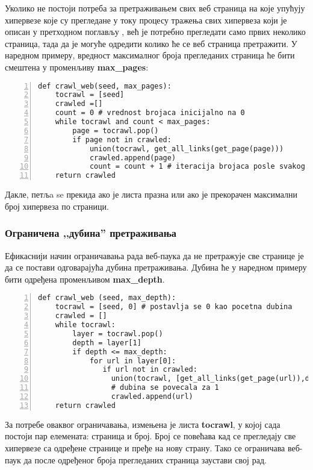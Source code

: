 Уколико не постоји потреба за претраживањем свих веб страница на које упућују хипервезе које су прегледане у току процесу тражења свих хипервеза који је описан у претходном поглављу , већ је потребно прегледати само првих неколико страница, тада да је могуће одредити колико ће се веб страница претражити. У наредном примеру, вредност максималног броја прегледаних страница ће бити смештена у променљиву \textbf{max\_pages}:

\begin{lstlisting}[caption=Претраживање са ограниченим бројем страна, label={lst:crawlweb2}, numbers=left]
def crawl_web(seed, max_pages):
    tocrawl = [seed]
    crawled =[]
    count = 0 # vrednost brojaca inicijalno na 0
    while tocrawl and count < max_pages:
        page = tocrawl.pop()
        if page not in crawled:
            union(tocrawl, get_all_links(get_page(page)))
            crawled.append(page)
            count = count + 1 # iteracija brojaca posle svakog linka
    return crawled
\end{lstlisting}

Дакле, петљa se прекида ако је листа празна или ако је прекорачен максимални број хипервеза по страници.

\subsubsection{Ограничена ,,дубина'' претраживања}

Ефикаснији начин ограничавања рада веб-паука да не претражује све странице је да се постави одговарајућа дубина претраживања. Дубина ће у наредном примеру бити одређена променљивом \textbf{max\_depth}.

\begin{lstlisting}[caption=Скенирање ограничено по дубини, label={lst:crawlweb3}, numbers=left]
def crawl_web (seed, max_depth):
    tocrawl = [seed, 0] # postavlja se 0 kao pocetna dubina
    crawled = []
    while tocrawl:
        layer = tocrawl.pop()
        depth = layer[1]
        if depth <= max_depth:
            for url in layer[0]:
               if url not in crawled:
                 union(tocrawl, [get_all_links(get_page(url)),depth+1])
                 # dubina se povecala za 1
                 crawled.append(url)
    return crawled
\end{lstlisting}

За потребе оваквог ограничавања, измењена је листа \textbf{tocrawl}, у којој сада постоји пар елемената: страница и број. Број се повећава кад се прегледају све хипервезе са одређене странице и пређе на нову страну. Тако се  ограничава веб-паук да после одређеног броја прегледаних страница заустави свој рад.
\pagebreak
